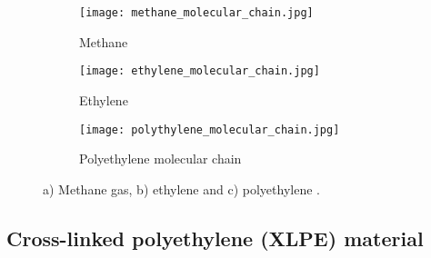 \begin{figure}[H]
\centering

\begin{subfigure}{.3\textwidth}
    \centering
    \texttt{[image: methane\_molecular\_chain.jpg]}
    \caption{Methane}
\end{subfigure}
\begin{subfigure}{.3\textwidth}
    \centering
    \texttt{[image: ethylene\_molecular\_chain.jpg]}
    \caption{Ethylene}
\end{subfigure}
\begin{subfigure}{.65\textwidth}
    \centering
    \texttt{[image: polythylene\_molecular\_chain.jpg]}
    \caption{Polyethylene molecular chain}
\end{subfigure}

\caption{a) Methane gas, b) ethylene and c) polyethylene \cite{gabriel1998history}.}
\label{ch3:figure:molecular_chains}
\end{figure}

\subsection{Cross-linked polyethylene (XLPE) material}

